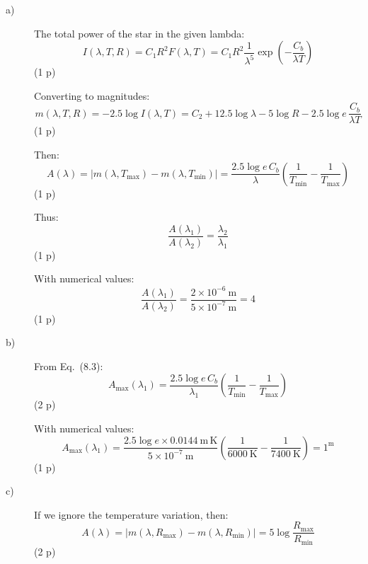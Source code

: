 \begin{description}
\item[a)] The total power of the star in the given lambda:
  \begin{equation*}
  I(\lambda, T, R) = C_1 R^2 F(\lambda, T)
    = C_1 R^2 \frac{1}{\lambda^5}
      \exp\left(-\frac{C_b}{\lambda T}\right) \tag{8.1}
  \end{equation*}
  \hfill(1 p)

  Converting to magnitudes:
  \begin{equation*}
  m(\lambda, T, R) = -2.5\log I(\lambda, T)
    = C_2 + 12.5\log\lambda - 5\log R
      - 2.5\log e\,\frac{C_b}{\lambda T} \tag{8.2}
  \end{equation*}
  \hfill(1 p)

  Then:
  \begin{equation*}
  A(\lambda) = \left|m(\lambda, T_{\mathrm{max}})
    - m(\lambda, T_{\mathrm{min}})\right|
    = \frac{2.5\log e\,C_b}{\lambda}
      \left(\frac{1}{T_{\mathrm{min}}}
      - \frac{1}{T_{\mathrm{max}}}\right) \tag{8.3}
  \end{equation*}
  \hfill(1 p)

  Thus:
  \begin{equation*}
  \frac{A(\lambda_1)}{A(\lambda_2)} = \frac{\lambda_2}{\lambda_1} \tag{8.4}
  \end{equation*}
  \hfill(1 p)

  With numerical values:
  \[ \frac{A(\lambda_1)}{A(\lambda_2)}
     = \frac{2\times 10^{-6}\ \mathrm{m}}{5\times 10^{-7}\ \mathrm{m}}
     = 4 \]
  \hfill(1 p)
\item[b)] From Eq.\ (8.3):
  \begin{equation*}
  A_{\mathrm{max}}(\lambda_1) = \frac{2.5\log e\,C_b}{\lambda_1}
    \left(\frac{1}{T_{\mathrm{min}}}
    - \frac{1}{T_{\mathrm{max}}}\right) \tag{8.5}
  \end{equation*}
  \hfill(2 p)

  With numerical values:
  \[ A_{\mathrm{max}}(\lambda_1)
     = \frac{2.5\log e\times 0.0144\ \mathrm{m\,K}}
            {5\times 10^{-7}\ \mathrm{m}}
       \left(\frac{1}{6000\ \mathrm{K}}
       - \frac{1}{7400\ \mathrm{K}}\right)
     = 1^{\mathrm{m}} \]
  \hfill(1 p)
\item[c)] If we ignore the temperature variation, then:
  \begin{equation*}
  A(\lambda) = \left|m(\lambda, R_{\mathrm{max}})
    - m(\lambda, R_{\mathrm{min}})\right|
    = 5\log\frac{R_{\mathrm{max}}}{R_{\mathrm{min}}} \tag{8.6}
  \end{equation*}
  \hfill(2 p)


\end{description}
